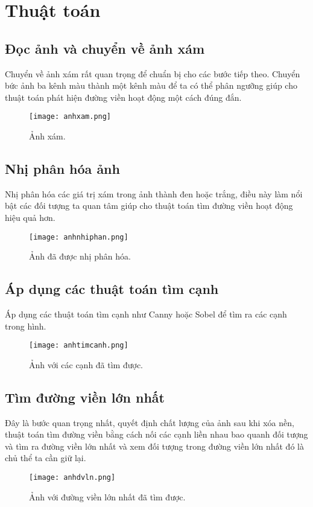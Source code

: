 \documentclass[conference]{IEEEtran}
\begin{document}
\section{Thuật toán}

\subsection{Đọc ảnh và chuyển về ảnh xám}
Chuyển về ảnh xám rất quan trọng để chuẩn bị cho các bước tiếp theo. Chuyển bức ảnh ba kênh màu thành một kênh màu để ta có thể phân ngưỡng giúp cho thuật toán phát hiện đường viền hoạt động một cách đúng đắn.
\begin{figure}[!htb]
\centerline{\texttt{[image: anhxam.png]}}
\caption{Ảnh xám.}
\label{fig}
\end{figure}
 \FloatBarrier
\subsection{Nhị phân hóa ảnh}
Nhị phân hóa các giá trị xám trong ảnh thành đen hoặc trắng, điều này làm nổi bật các đối tượng ta quan tâm giúp cho thuật toán tìm đường viền hoạt động hiệu quả hơn.
\begin{figure}[!htb]
\centerline{\texttt{[image: anhnhiphan.png]}}
\caption{Ảnh đã được nhị phân hóa.}
\label{fig}
\end{figure}
 \FloatBarrier
\subsection{Áp dụng các thuật toán tìm cạnh}
Áp dụng các thuật toán tìm cạnh như Canny hoặc Sobel để tìm ra các cạnh trong hình.
\begin{figure}[!htb]
\centerline{\texttt{[image: anhtimcanh.png]}}
\caption{Ảnh với các cạnh đã tìm được.}
\label{fig}
\end{figure}
 \FloatBarrier
\subsection{Tìm đường viền lớn nhất}
Đây là bước quan trọng nhất, quyết định chất lượng của ảnh sau khi xóa nền, thuật toán tìm đường viền bằng cách nối các cạnh liền nhau bao quanh đối tượng và tìm ra đường viền lớn nhất và xem đối tượng trong đường viền lớn nhất đó là chủ thể ta cần giữ lại.
\begin{figure}[!htb]
\centerline{\texttt{[image: anhdvln.png]}}
\caption{Ảnh với đường viền lớn nhất đã tìm được.}
\label{fig}
\end{figure}
 \FloatBarrier
\end{document}
